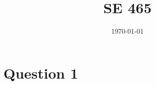 \documentclass[11pt]{article}
\title{SE 465}
\date{\today}
\begin{document}
\maketitle

\section{Question 1}
\end{document}
